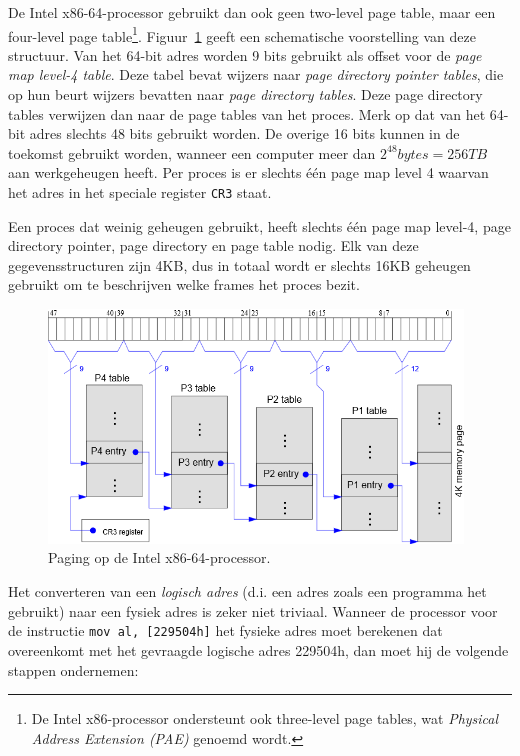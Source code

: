 De Intel x86-64-processor gebruikt dan ook geen two-level page table, maar een four-level page table\footnote{De Intel x86-processor ondersteunt ook three-level page tables, wat \emph{Physical Address Extension (PAE)} genoemd wordt.}. Figuur~\ref{paging-x86-64} geeft een schematische voorstelling van deze structuur. Van het 64-bit adres worden 9 bits gebruikt als offset voor de \emph{page map level-4 table}. Deze tabel bevat wijzers naar \emph{page directory pointer tables}, die op hun beurt wijzers bevatten naar \emph{page directory tables}. Deze page directory tables verwijzen dan naar de page tables van het proces. Merk op dat van het 64-bit adres slechts 48 bits gebruikt worden. De overige 16 bits kunnen in de toekomst gebruikt worden, wanneer een computer meer dan $2^{48} bytes = 256TB$ aan werkgeheugen heeft. Per proces is er slechts \'e\'en page map level 4 waarvan het adres in het speciale register \texttt{CR3} staat.

Een proces dat weinig geheugen gebruikt, heeft slechts \'e\'en page map level-4, page directory pointer, page directory en page table nodig. Elk van deze gegevensstructuren zijn 4KB, dus in totaal wordt er slechts 16KB geheugen gebruikt om te beschrijven welke frames het proces bezit.

\begin{figure}
\begin{center}
\includegraphics[width=110mm]{images/x86-64-paging.png}
\end{center}
\caption{Paging op de Intel x86-64-processor.}
\label{paging-x86-64}
\end{figure}

Het converteren van een \emph{logisch adres} (d.i. een adres zoals een programma het gebruikt) naar een fysiek adres is zeker niet triviaal. Wanneer de processor voor de instructie \texttt{mov al, [229504h]} het fysieke adres moet berekenen dat overeenkomt met het gevraagde logische adres 229504h, dan moet hij de volgende stappen ondernemen:

